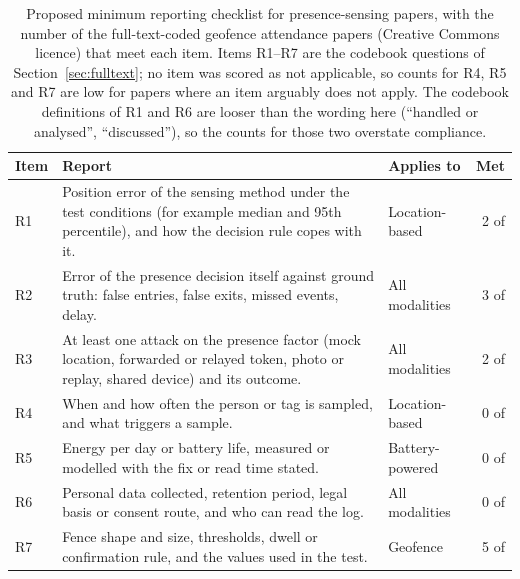 \begin{table}[tbp]\centering\footnotesize
\caption{Proposed minimum reporting checklist for presence-sensing papers, with the number of the \ftN{} full-text-coded geofence attendance papers (Creative Commons licence) that meet each item. Items R1--R7 are the codebook questions of Section~\ref{sec:fulltext}; no item was scored as not applicable, so counts for R4, R5 and R7 are low for papers where an item arguably does not apply. The codebook definitions of R1 and R6 are looser than the wording here (``handled or analysed'', ``discussed''), so the counts for those two overstate compliance.}\label{tab:checklist}
\begin{tabular}{@{}lL{7.4cm}L{2.2cm}r@{}}\toprule Item & Report & Applies to & Met \\ \midrule
R1 & Position error of the sensing method under the test conditions (for example median and 95th percentile), and how the decision rule copes with it. & Location-based & 2 of \ftN{} \\
R2 & Error of the presence decision itself against ground truth: false entries, false exits, missed events, delay. & All modalities & 3 of \ftN{} \\
R3 & At least one attack on the presence factor (mock location, forwarded or relayed token, photo or replay, shared device) and its outcome. & All modalities & 2 of \ftN{} \\
R4 & When and how often the person or tag is sampled, and what triggers a sample. & Location-based & 0 of \ftN{} \\
R5 & Energy per day or battery life, measured or modelled with the fix or read time stated. & Battery-powered & 0 of \ftN{} \\
R6 & Personal data collected, retention period, legal basis or consent route, and who can read the log. & All modalities & 0 of \ftN{} \\
R7 & Fence shape and size, thresholds, dwell or confirmation rule, and the values used in the test. & Geofence & 5 of \ftN{} \\
\bottomrule\end{tabular}\end{table}
